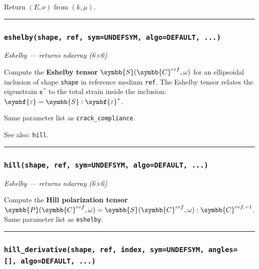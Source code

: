 \documentclass[
  a4paper,
  numbers=noendperiod,
  DIV=12]{scrreprt}
\newcommand{\uu}[1]{{\symbf{{#1}}}}
\newcommand{\uuuu}[1]{{\symbb{{#1}}}}
\begin{document}
Return \((E,\nu)\) from \((k,\mu)\).

\begin{center}\rule{0.5\linewidth}{0.5pt}\end{center}

\subsubsection{\texorpdfstring{\texttt{eshelby(shape,\ ref,\ sym=UNDEFSYM,\ algo=DEFAULT,\ ...)}}{eshelby(shape, ref, sym=UNDEFSYM, algo=DEFAULT, ...)}}\label{api-eshelby}

\emph{Eshelby --- returns ndarray (6×6)}

Compute the \textbf{Eshelby tensor} \(\uuuu{S}(\uuuu{C}^{ref},\omega)\)
for an ellipsoidal inclusion of shape \texttt{shape} in reference medium
\texttt{ref}. The Eshelby tensor relates the eigenstrain
\(\uu{\varepsilon}^*\) to the total strain inside the inclusion:
\(\uu{\varepsilon} = \uuuu{S}:\uu{\varepsilon}^*\).

Same parameter list as \texttt{crack\_compliance}.

See also: \texttt{hill}.

\begin{center}\rule{0.5\linewidth}{0.5pt}\end{center}

\subsubsection{\texorpdfstring{\texttt{hill(shape,\ ref,\ sym=UNDEFSYM,\ algo=DEFAULT,\ ...)}}{hill(shape, ref, sym=UNDEFSYM, algo=DEFAULT, ...)}}\label{api-hill}

\emph{Eshelby --- returns ndarray (6×6)}

Compute the \textbf{Hill polarization tensor}
\(\uuuu{P}(\uuuu{C}^{ref},\omega) = \uuuu{S}(\uuuu{C}^{ref},\omega):\uuuu{C}^{ref,-1}\).
Same parameter list as \texttt{eshelby}.

\begin{center}\rule{0.5\linewidth}{0.5pt}\end{center}

\subsubsection{\texorpdfstring{\texttt{hill\_derivative(shape,\ ref,\ index,\ sym=UNDEFSYM,\ angles={[}{]},\ algo=DEFAULT,\ ...)}}{hill\_derivative(shape, ref, index, sym=UNDEFSYM, angles={[}{]}, algo=DEFAULT, ...)}}\label{api-hill-derivative}
\end{document}
